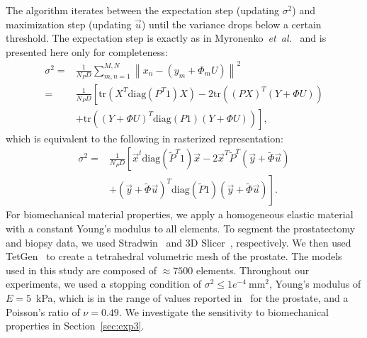 \documentclass[journal]{IEEEtran}
\newcommand{\trace}{\mathrm{tr}}
\newcommand{\diag}{\mathrm{diag}}
\begin{document}
The algorithm iterates between the expectation step (updating $\sigma^2$) and maximization step (updating $\vec{u}$) until the variance drops below a certain threshold.  The expectation step is exactly as in Myronenko~\textit{et~al.}~\cite{Myronenko10a} and is presented here only for completeness:
\begin{align}
\sigma^2 = & \frac{1}{N_PD}\sum_{m,n=1}^{M,N}\left\|x_n- (y_m+\Phi_mU)\right\|^2 \nonumber\\
= & \frac{1}{N_PD}\left[\trace\!\left(X^T\diag(P^T1)X\right)-2\trace\!\left((PX)^T(Y+{\Phi}U)\right)\right.\nonumber\\
& \left.+\trace\!\left((Y+{\Phi}U)^T\diag(P1)(Y+{\Phi}U)\right)\right], \label{eq:estep1}
\end{align}
which is equivalent to the following in rasterized representation:
\begin{align} 
\sigma^2 = & \frac{1}{N_PD}\left[\vec{x}^t\diag\!\left(\tilde{P}^T1\right)\vec{x} -2\vec{x}^T\tilde{P}^T(\vec{y}+\tilde{\Phi}\vec{u})\right.\nonumber\\
  & \left.+(\vec{y}+\tilde{\Phi}\vec{u})^T\diag\!\left(\tilde{P}1\right)(\vec{y}+\tilde{\Phi}\vec{u})\right]. \label{eq:estep2}
\end{align}
For biomechanical material properties, we apply a homogeneous elastic material with a constant Young's modulus to all elements. To segment the prostatectomy and biopsy data, we used Stradwin~\cite{Treece00a} and 3D Slicer~\cite{Fedorov12a}, respectively. We then used TetGen~\cite{Si06a} to create a tetrahedral volumetric mesh of the prostate.  The models used in this study are composed of $\approx7500$ elements. Throughout our experiments, we used a stopping condition of $\sigma^2\leq1e^{-4}~\mathrm{mm}^2$, Young's modulus of $E=5$~kPa, which is in the range of values reported in~\cite{Kemper04a} for the prostate, and a Poisson's ratio of $\nu=0.49$. We investigate the sensitivity to biomechanical properties in Section~\ref{sec:exp3}.

\end{document}
